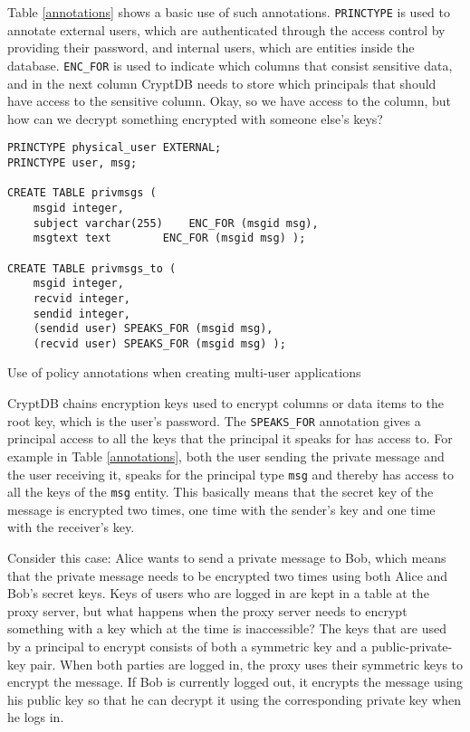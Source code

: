 Table \ref{annotations} shows a basic use of such annotations. \verb!PRINCTYPE! is used to annotate external users, which are authenticated through the access control by providing their password, and internal users, which are entities inside the database. \verb!ENC_FOR! is used to indicate which columns that consist sensitive data, and in the next column CryptDB needs to store which principals that should have access to the sensitive column. Okay, so we have access to the column, but how can we decrypt something encrypted with someone else's keys?

\begin{table}[H]
\begin{Verbatim}[frame=single]
PRINCTYPE physical_user EXTERNAL;
PRINCTYPE user, msg;

CREATE TABLE privmsgs (
	msgid integer,
	subject varchar(255)	ENC_FOR (msgid msg),
	msgtext text		ENC_FOR (msgid msg) );

CREATE TABLE privmsgs_to (
	msgid integer,
	recvid integer,
	sendid integer,
	(sendid user) SPEAKS_FOR (msgid msg),
	(recvid user) SPEAKS_FOR (msgid msg) ); 
\end{Verbatim}
\caption{Use of policy annotations when creating multi-user applications}
\label{annotations}
\end{table}
CryptDB chains encryption keys used to encrypt columns or data items to the root key, which is the user's password. The \verb!SPEAKS_FOR! annotation gives a principal access to all the keys that the principal it speaks for has access to. For example in Table \ref{annotations}, both the user sending the private message and the user receiving it, speaks for the principal type \verb!msg! and thereby has access to all the keys of the \verb!msg! entity. This basically means that the secret key of the message is encrypted two times, one time with the sender's key and one time with the receiver's key.

Consider this case: Alice wants to send a private message to Bob, which means that the private message needs to be encrypted two times using both Alice and Bob's secret keys. Keys of users who are logged in are kept in a table at the proxy server, but what happens when the proxy server needs to encrypt something with a key which at the time is inaccessible? The keys that are used by a principal to encrypt consists of both a symmetric key and a public-private-key pair. When both parties are logged in, the proxy uses their symmetric keys to encrypt the message. If Bob is currently logged out, it encrypts the message using his public key so that he can decrypt it using the corresponding private key when he logs in.

